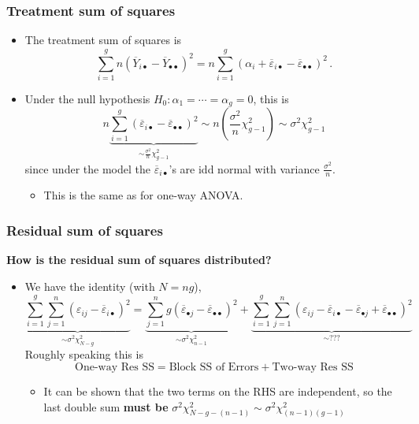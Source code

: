 \documentclass[a4paper]{article}\usepackage[]{graphicx}\usepackage[]{xcolor}
\begin{document}
\subsubsection{Treatment sum of squares}
\begin{itemize}
	\item The treatment sum of squares is
	\[
		\sum_{i=1}^gn(\overline Y_{i\bullet}-\overline Y_{\bullet\bullet})^2 =  n\sum_{i=1}^g(\alpha_i+\overline \varepsilon_{i\bullet}-\overline \varepsilon_{\bullet\bullet})^2\,.
	\]
	\item Under the null hypothesis \( H_0: \alpha_1 = \dotsb = \alpha_g = 0 \), this is
	\[
		n\underbrace{\sum_{i=1}^g(\overline \varepsilon_{i\bullet}-\overline \varepsilon_{\bullet\bullet})^2}_{\sim \frac{\sigma^2}{n}\chi^2_{g-1}}\sim n \left( \frac{\sigma^2}{n}\chi^2_{g-1} \right)\sim \sigma^2 \chi^2_{g-1}
	\]
	since under the model the \( \overline{\varepsilon}_{i\bullet} \)'s are idd normal with variance \( \frac{\sigma^2}{n} \).
	\begin{itemize}
		\item This is the same as for one-way ANOVA.
	\end{itemize}
\end{itemize}
\subsubsection{Residual sum of squares}
\textbf{How is the residual sum of squares distributed?}
\begin{itemize}
	\item We have the identity (with \( N = ng \)),
	\[
		\underbrace{\sum_{i=1}^g\sum_{j=1}^n (\varepsilon_{ij}-\overline \varepsilon_{i\bullet})^2}_{\sim \sigma^2\chi^2_{N-g}} = \underbrace{\sum_{j=1}^n g(\overline \varepsilon_{\bullet j}-\overline\varepsilon_{\bullet\bullet})^2}_{\sim \sigma^2\chi^2_{n-1}} + \underbrace{\sum_{i=1}^g\sum_{j=1}^n (\varepsilon_{ij}-\overline \varepsilon_{i\bullet}-\overline \varepsilon_{\bullet j}+\overline \varepsilon_{\bullet\bullet})^2}_{\sim ???}
	\]
	Roughly speaking this is
	\[
		\text{One-way Res SS} = \text{Block SS of Errors} + \text{Two-way Res SS}
	\]
	\begin{itemize}
		\item It can be shown that the two terms on the RHS are independent, so the last double sum \textbf{must be} \( \sigma^2\chi^2_{N-g-(n-1)}\sim\sigma^2\chi^2_{(n-1)(g-1)} \) 
	\end{itemize}
\end{itemize}
\end{document}
